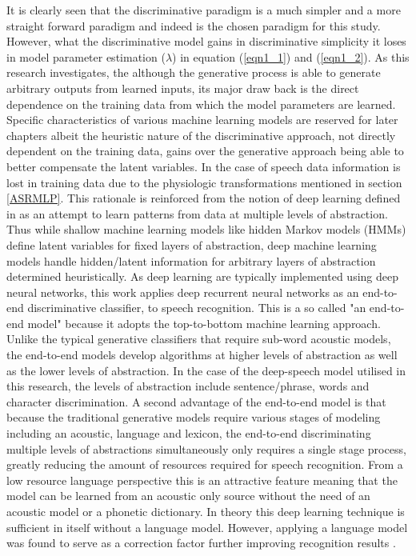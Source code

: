 It is clearly seen that the discriminative paradigm is a much simpler and a more straight forward paradigm and indeed is the chosen paradigm for this study.  However, what the discriminative model gains in discriminative simplicity it loses in model parameter estimation  ($\lambda$) in equation  (\ref{eqn1_1}) and (\ref{eqn1_2}).  
 As this research investigates, the although the generative process is able to generate arbitrary outputs from learned inputs, its major draw back is the direct dependence on the training data from which the model parameters are learned. Specific characteristics of various machine learning models are reserved for later chapters albeit the heuristic nature of the discriminative approach, not directly dependent on the training data,  gains over the generative approach being able to better compensate the latent variables.  In the case of speech data information is lost in training data due to the physiologic transformations mentioned in section \ref{ASRMLP}.  This rationale is reinforced from the notion of deep learning defined in \cite{deng2014deep} as an attempt to learn patterns from data at multiple levels of abstraction. Thus while shallow machine learning models like hidden Markov models (HMMs) define latent variables for fixed layers of abstraction, deep machine learning models handle hidden/latent information for arbitrary layers of abstraction determined heuristically.  As deep learning are typically implemented using deep neural networks, this work applies deep recurrent neural networks as an end-to-end discriminative classifier, to speech recognition.  This is a so called "an end-to-end model" because it adopts the top-to-bottom machine learning approach. Unlike the typical generative classifiers that require sub-word acoustic models, the end-to-end models develop algorithms at higher levels of abstraction as well as the lower levels of abstraction.  In the case of the deep-speech model \citep{hannun2014first} utilised in this research, the levels of abstraction include sentence/phrase, words and character discrimination. A second advantage of the end-to-end model is that because the traditional generative models require various stages of modeling including an acoustic, language and lexicon, the end-to-end discriminating multiple levels of abstractions simultaneously only requires a single stage process, greatly reducing the amount of resources required for speech recognition.  From a low resource language perspective this is an attractive feature meaning that the model can be learned from an acoustic only source without the need of an acoustic model or a phonetic dictionary.  In theory this deep learning technique is sufficient in itself without a language model.  However, applying a language model was found to serve as a correction factor further improving recognition results \citep{hannun2014deep}. 

